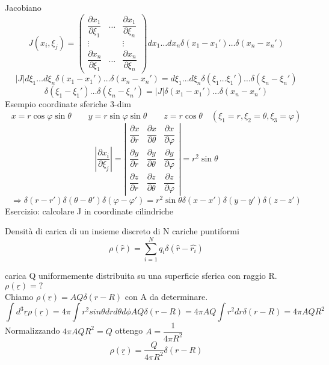 \documentclass[a4paper,11pt]{report}
\begin{document}
Jacobiano
$$
J(x_i,\xi_j)=\left(\begin{matrix}
\dfrac{\partial x_1}{\partial \xi_1} & \dots & \dfrac{\partial x_1}{\partial \xi_n}\\
\vdots & & \vdots \\
\dfrac{\partial x_n}{\partial \xi_1} & \dots &\dfrac{\partial x_n}{\partial \xi_n}
\end{matrix}\right)dx_1\dots dx_n \delta(x_1-x_1')\dots \delta(x_n - x_n')
$$
$$
|J|d\xi_1\dots d\xi_n \delta(x_1 - x_1')\dots \delta(x_n-x_n')=d\xi_1 \dots d\xi_n\delta(\xi_1\dots \xi_1')\dots \delta(\xi_n - \xi_n')
$$
\begin{equation}
\delta(\xi_1-\xi_1')\dots\delta(\xi_n-\xi_n')=|J|\delta(x_1-x_1')\dots\delta(x_n-x_n')
\end{equation}
Esempio coordinate sferiche 3-dim
$$
x=r\cos\varphi\sin\theta \qquad y=r\sin\varphi\sin\theta \qquad z=r\cos\theta \quad (\xi_1=r,\xi_2=\theta,\xi_3=\varphi)
$$
$$\left|\dfrac{\partial x_i}{\partial \xi_j}\right|=\left|\begin{matrix}
\dfrac{\partial x}{\partial r} & \dfrac{\partial x}{\partial \theta} & \dfrac{\partial x}{\partial \varphi} \\
\dfrac{\partial y}{\partial r} & \dfrac{\partial y}{\partial \theta} & \dfrac{\partial y}{\partial \varphi}\\
\dfrac{\partial z}{\partial r} & \dfrac{\partial z}{\partial \theta} & \dfrac{\partial z}{\partial \varphi}
\end{matrix}\right|=r^2\sin\theta
$$
\begin{equation}
\Rightarrow \delta(r-r')\delta(\theta - \theta')\delta(\varphi - \varphi') = r^2\sin\theta \delta(x-x')\delta(y-y')\delta(z-z')
\end{equation}
Esercizio: calcolare J in coordinate cilindriche

Densità di carica di un insieme discreto di N cariche puntiformi
\begin{equation}
\rho(\hat{r}) = \sum_{i=1}^{N} q_i\delta(\hat{r}-\hat{r_i})
\end{equation}

carica Q uniformemente distribuita su una superficie sferica con raggio R. $\rho(\underline{r})=?$\\
Chiamo $\rho(\underline{r})=A Q\delta(r-R)$ con A da determinare.
$$\int d^3\underline{r}\rho(\underline{r})= 4\pi \int r^2 sin\theta dr d\theta d\phi A Q \delta(r-R) = 4\pi AQ \int r^2 dr \delta(r-R)=4\pi AQR^2 $$
Normalizzando $4\pi AQR^2 =Q$ ottengo $A=\dfrac{1}{4\pi R^2}$
$$ \rho(\underline{r})=\dfrac{Q}{4\pi R^2}\delta(r-R)$$
\end{document}
